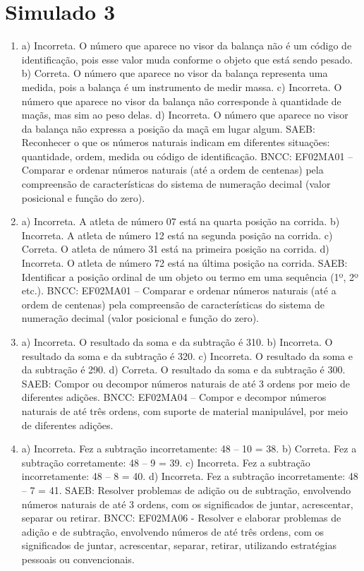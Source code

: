 \section*{Simulado 3}

\begin{enumerate}
\item
a) Incorreta. O número que aparece no visor da balança não é um código
de identificação, pois esse valor muda conforme o objeto que está sendo
pesado.
b) Correta. O número que aparece no visor da balança representa uma
medida, pois a balança é um instrumento de medir massa.
c) Incorreta. O número que aparece no visor da balança não corresponde à
quantidade de maçãs, mas sim ao peso delas.
d) Incorreta. O número que aparece no visor da balança não expressa a
posição da maçã em lugar algum.
SAEB: Reconhecer o que os números naturais indicam em diferentes
situações: quantidade, ordem, medida ou código de identificação.
BNCC: EF02MA01 -- Comparar e ordenar números naturais (até a ordem de
centenas) pela compreensão de características do sistema de numeração
decimal (valor posicional e função do zero).

\item
a) Incorreta. A atleta de número 07 está na quarta posição na corrida.
b) Incorreta. A atleta de número 12 está na segunda posição na corrida.
c) Correta. O atleta de número 31 está na primeira posição na corrida.
d) Incorreta. O atleta de número 72 está na última posição na corrida.
SAEB: Identificar a posição ordinal de um objeto ou termo
em uma sequência (1º, 2º etc.).
BNCC: EF02MA01 -- Comparar e ordenar números naturais (até a ordem de
centenas) pela compreensão de características do sistema de numeração
decimal (valor posicional e função do zero).

\item
a) Incorreta. O resultado da soma e da subtração é 310.
b) Incorreta. O resultado da soma e da subtração é 320.
c) Incorreta. O resultado da soma e da subtração é 290.
d) Correta. O resultado da soma e da subtração é 300.
SAEB: Compor ou decompor números naturais de até 3 ordens por
meio de diferentes adições.
BNCC: EF02MA04 -- Compor e decompor números naturais de até três ordens,
com suporte de material manipulável, por meio de diferentes adições.

\item
a) Incorreta. Fez a subtração incorretamente: 48 -- 10 = 38.
b) Correta. Fez a subtração corretamente: 48 -- 9 = 39.
c) Incorreta. Fez a subtração incorretamente: 48 -- 8 = 40.
d) Incorreta. Fez a subtração incorretamente: 48 -- 7 = 41.
SAEB: Resolver problemas de adição ou de subtração, envolvendo
números naturais de até 3 ordens, com os significados de juntar,
acrescentar, separar ou retirar.
BNCC: EF02MA06 - Resolver e elaborar problemas de adição e de subtração,
envolvendo números de até três ordens, com os significados de juntar,
acrescentar, separar, retirar, utilizando estratégias pessoais ou
convencionais.


\end{enumerate}
